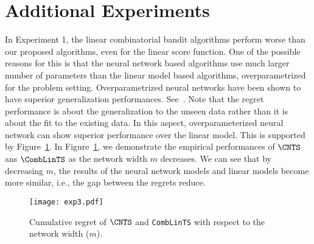 \documentclass{article}
\theoremstyle{plain}
\begin{document}
\section{Additional Experiments}
In Experiment 1, the linear combinatorial bandit algorithms perform worse than our proposed algorithms, even for the linear score function.
One of the possible reasons for this is that the neural network based algorithms use much larger number of parameters than the linear model based algorithms, overparametrized for the problem setting.
Overparametrized neural networks have been shown to have superior generalization performances. See~\citet{allenzhu2019convergence, allenzhu2019learning}.
Note that the regret performance is about the generalization to the unseen data rather than it is
about the fit to the existing data. 
In this aspect, overparameterized neural network can show superior
performance over the linear model.
This is supported by Figure~\ref{Fig3}. In Figure~\ref{Fig3}, we demonstrate the empirical performances of $\CNTS$ ans $\CombLinTS$ as the network width $m$ decreases. 
We can see that by decreasing $m$, the results of the neural network models and 
linear models become more similar, i.e., the gap between the regrets reduce.
%
\begin{figure*}[t!]
    \begin{center}
    \centerline{\texttt{[image: exp3.pdf]}}
    \vskip -0.2in %
    \caption{Cumulative regret of $\CNTS$ and \texttt{CombLinTS} with respect to the network width ($m$).}
    \label{Fig3}
    \end{center}
\vskip -0.4in %
\end{figure*}
\end{document}
